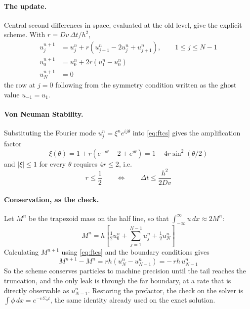 \documentclass[11pt]{article}
\begin{document}
\paragraph{The update.} Central second differences in space, evaluated at the old level, give
the explicit scheme. With $r = Dv\,\Delta t/h^2$,
\begin{align}
    u_j^{n+1} &= u_j^n + r\left(u_{j-1}^n - 2u_j^n + u_{j+1}^n\right), \qquad 1 \le j \le N-1
    \label{eq:ftcs} \\
    u_0^{n+1} &= u_0^n + 2r\left(u_1^n - u_0^n\right) \\
    u_N^{n+1} &= 0
\end{align}
the row at $j=0$ following from the symmetry condition written as the ghost value
$u_{-1} = u_1$.

\paragraph{Von Neuman Stability.} Substituting the Fourier mode $u_j^n = \xi^n e^{ij\theta}$ into
\eqref{eq:ftcs} gives the amplification factor
\begin{equation}
    \xi(\theta) = 1 + r\left(e^{-i\theta} - 2 + e^{i\theta}\right) = 1 - 4r\sin^2(\theta/2)
    \label{eq:stab}
\end{equation}
and $|\xi| \le 1$ for every $\theta$ requires $4r \le 2$, i.e.
\begin{equation}
    r \le \frac{1}{2}
    \qquad\Longleftrightarrow\qquad
    \Delta t \le \frac{h^2}{2Dv}
\end{equation}


\paragraph{Conservation, as the check.} Let $M^n$ be the trapezoid mass on the half line, so
that $\int_{-\infty}^{\infty}u\,dx \approx 2M^n$:
\begin{equation}
    M^n = h\left[\tfrac{1}{2}u_0^n + \sum_{j=1}^{N-1}u_j^n + \tfrac{1}{2}u_N^n\right]
\end{equation}
Calculating $M^{n+1}$ using \eqref{eq:ftcs} and the boundary conditions gives
\begin{equation}
    M^{n+1} - M^n = r h\left(u_N^n - u_{N-1}^n\right) = -\,r h\,u_{N-1}^n
    \label{eq:conserve}
\end{equation}
So the scheme conserves particles to machine precision until the tail reaches the truncation,
and the only leak is through the far boundary, at a rate that is directly observable as
$u_{N-1}^n$. Restoring the prefactor, the check on the solver is
$\int\phi\,dx = e^{-v\Sigma_a t}$, the same identity already used on the exact solution.
\end{document}
